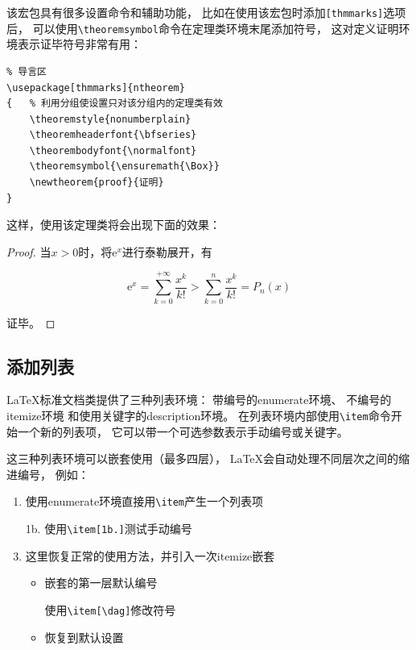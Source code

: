 \documentclass[UTF8]{ctexart}
\numberwithin{equation}{section}			%
\begin{document}
    该宏包具有很多设置命令和辅助功能，
    比如在使用该宏包时添加\verb|[thmmarks]|选项后，
    可以使用\verb|\theoremsymbol|命令在定理类环境末尾添加符号，
    这对定义证明环境表示证毕符号非常有用：
    
\begin{lstlisting}
% 导言区
\usepackage[thmmarks]{ntheorem}
{	% 利用分组使设置只对该分组内的定理类有效
    \theoremstyle{nonumberplain}
    \theoremheaderfont{\bfseries}
    \theorembodyfont{\normalfont}
    \theoremsymbol{\ensuremath{\Box}}
    \newtheorem{proof}{证明}
}
\end{lstlisting}
    
    这样，使用该定理类将会出现下面的效果：
    
    \begin{proof}
        当$x>0$时，将$\mathrm{e}^x$进行泰勒展开，有
        
        \[
            \mathrm{e}^x = \sum_{k=0}^{+\infty} \frac{x^k}{k!} 
            >\sum_{k=0}^{n} \frac{x^k}{k!}=P_n(x)
        \]
        
        证毕。
    \end{proof}
    
    \subsection{添加列表}
    \LaTeX 标准文档类提供了三种列表环境：
    带编号的enumerate环境、
    不编号的itemize环境
    和使用关键字的description环境。
    在列表环境内部使用\verb|\item|命令开始一个新的列表项，
    它可以带一个可选参数表示手动编号或关键字。
    
    这三种列表环境可以嵌套使用（最多四层），
    \LaTeX 会自动处理不同层次之间的缩进编号，
    例如：
    
    \begin{enumerate}
        \item 使用enumerate环境直接用\verb|\item|产生一个列表项
        \item[1b.] 使用\verb|\item[1b.]|测试手动编号
        \item 这里恢复正常的使用方法，并引入一次itemize嵌套
        \begin{itemize}
            \item 嵌套的第一层默认编号
            \item[\dag] 使用\verb|\item[\dag]|修改符号
            \item 恢复到默认设置
        \end{itemize}
    \end{enumerate}
    
\end{document}
